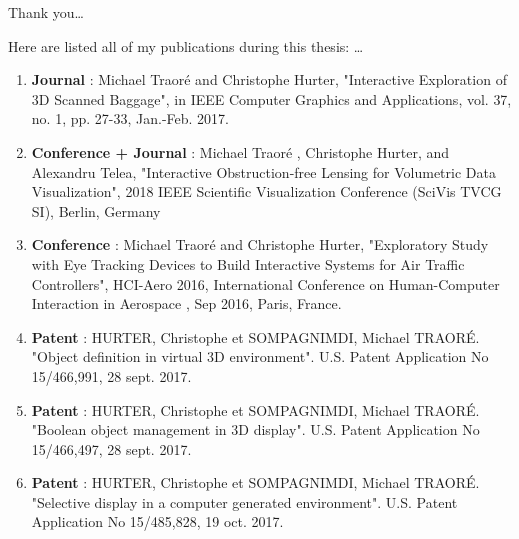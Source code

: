 \documentclass[
11pt, %
english, %
onehalfspacing %
parskip, %
headsepline, %
]{MastersDoctoralThesis} %
\begin{document}

\begin{acknowledgements}
\addchaptertocentry{\acknowledgementname} %
Thank you\ldots
\end{acknowledgements}

\begin{publications}
\addchaptertocentry{\publicationname} %
Here are listed all of my publications during this thesis: \ldots
\begin{enumerate}

\item \textbf{ Journal }: Michael Traor\'e and Christophe Hurter, "Interactive Exploration of 3D Scanned Baggage", in IEEE Computer Graphics and Applications, vol. 37, no. 1, pp. 27-33, Jan.-Feb. 2017.
\item \textbf{ Conference + Journal} : Michael Traor\'e , Christophe Hurter, and Alexandru Telea, "Interactive Obstruction-free Lensing for Volumetric Data Visualization", 2018 IEEE Scientific Visualization Conference (SciVis  TVCG SI), Berlin, Germany
\item  \textbf{ Conference} :  Michael Traor\'e and Christophe Hurter, "Exploratory Study with Eye Tracking Devices to Build Interactive Systems for Air Traffic Controllers", HCI-Aero 2016, International Conference on Human-Computer Interaction in Aerospace , Sep 2016, Paris, France.
\item \textbf{ Patent } : HURTER, Christophe et SOMPAGNIMDI, Michael TRAORÉ. "Object definition in virtual 3D environment". U.S. Patent Application No 15/466,991, 28 sept. 2017.
\item \textbf{ Patent } : HURTER, Christophe et SOMPAGNIMDI, Michael TRAORÉ. "Boolean object management in 3D display". U.S. Patent Application No 15/466,497, 28 sept. 2017.
\item \textbf{ Patent } : HURTER, Christophe et SOMPAGNIMDI, Michael TRAORÉ. "Selective display in a computer generated environment". U.S. Patent Application No 15/485,828, 19 oct. 2017.

\end{enumerate}

\end{publications}
\end{document}
